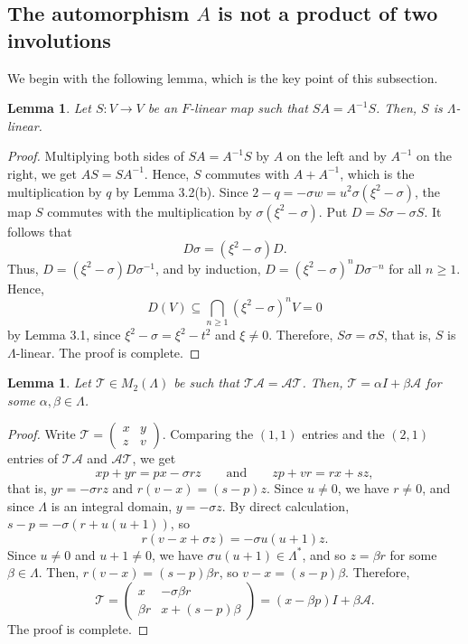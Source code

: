 \documentclass[11pt,reqno,a4paper]{amsart}
\numberwithin{equation}{section}
\newtheorem{lemma}[theorem]{Lemma}
\theoremstyle{definition}
\theoremstyle{plain}
\newcommand{\Acal}{\mathcal A}
\newcommand{\Tcal}{\mathcal T}
\begin{document}
\subsection{The automorphism \texorpdfstring{$A$}{A} is not a product of two involutions}
We begin with the following lemma, which is the key point of this subsection.

\begin{lemma}
Let $S:V\to V$ be an $F$-linear map such that $SA=A^{-1}S$. Then, $S$ is $\Lambda$-linear.
\end{lemma}
\begin{proof}
Multiplying both sides of $SA=A^{-1}S$ by $A$ on the left and by $A^{-1}$ on the right, we get $AS=SA^{-1}$. Hence, $S$ commutes with $A+A^{-1}$, which is the multiplication by $q$ by Lemma 3.2(b). Since $2-q=-\sigma w=u^2\sigma(\xi^2-\sigma)$, the map $S$ commutes with the multiplication by $\sigma(\xi^2-\sigma)$. Put $D=S\sigma-\sigma S$. It follows that
\[
D\sigma=(\xi^2-\sigma)D.
\]
Thus, $D=(\xi^2-\sigma)D\sigma^{-1}$, and by induction, $D=(\xi^2-\sigma)^nD\sigma^{-n}$ for all $n\ge1$. Hence,
\[
D(V)\subseteq\bigcap_{n\ge1}(\xi^2-\sigma)^nV=0
\]
by Lemma 3.1, since $\xi^2-\sigma=\xi^2-t^2$ and $\xi\ne0$. Therefore, $S\sigma=\sigma S$, that is, $S$ is $\Lambda$-linear. The proof is complete.
\end{proof}

\begin{lemma}
Let $\Tcal\in M_2(\Lambda)$ be such that $\Tcal\Acal=\Acal\Tcal$. Then, $\Tcal=\alpha I+\beta\Acal$ for some $\alpha,\beta\in\Lambda$.
\end{lemma}
\begin{proof}
Write $\Tcal=\begin{pmatrix}x&y\\z&v\end{pmatrix}$. Comparing the $(1,1)$ entries and the $(2,1)$ entries of $\Tcal\Acal$ and $\Acal\Tcal$, we get
\[
xp+yr=px-\sigma rz\qquad\text{and}\qquad zp+vr=rx+sz,
\]
that is, $yr=-\sigma rz$ and $r(v-x)=(s-p)z$. Since $u\ne0$, we have $r\ne0$, and since $\Lambda$ is an integral domain, $y=-\sigma z$. By direct calculation, $s-p=-\sigma(r+u(u+1))$, so
\[
r(v-x+\sigma z)=-\sigma u(u+1)z.
\]
Since $u\ne0$ and $u+1\ne0$, we have $\sigma u(u+1)\in\Lambda^*$, and so $z=\beta r$ for some $\beta\in\Lambda$. Then, $r(v-x)=(s-p)\beta r$, so $v-x=(s-p)\beta$. Therefore,
\[
\Tcal=\begin{pmatrix}x&-\sigma\beta r\\\beta r&x+(s-p)\beta\end{pmatrix}
=(x-\beta p)I+\beta\Acal.
\]
The proof is complete.
\end{proof}
\end{document}
